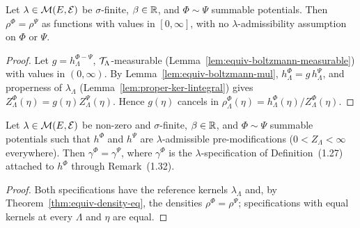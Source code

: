 \begin{theorem}
    \label{thm:equiv-density-eq}
    \leanok

    Let $\lambda \in \mathcal{M}(E, \mathcal{E})$ be $\sigma$-finite, $\beta \in \mathbb{R}$, and
    $\Phi \sim \Psi$ summable potentials. Then $\rho^\Phi = \rho^\Psi$ as functions with values
    in $[0,\infty]$, with no $\lambda$-admissibility assumption on $\Phi$ or $\Psi$.
\end{theorem}
\begin{proof}
    \leanok

    Let $g = h_\Lambda^{\Phi-\Psi}$, $\mathcal{T}_\Lambda$-measurable
    (Lemma~\ref{lem:equiv-boltzmann-measurable}) with values in $(0,\infty)$. By
    Lemma~\ref{lem:equiv-boltzmann-mul}, $h_\Lambda^\Phi = g \, h_\Lambda^\Psi$, and properness
    of $\lambda_\Lambda$ (Lemma~\ref{lem:proper-ker-lintegral}) gives $Z_\Lambda^\Phi(\eta) =
    g(\eta) Z_\Lambda^\Psi(\eta)$. Hence $g(\eta)$ cancels in $\rho_\Lambda^\Phi(\eta) =
    h_\Lambda^\Phi(\eta)/Z_\Lambda^\Phi(\eta)$.
\end{proof}

\begin{theorem}
    \label{thm:equiv-spec-eq}
    \leanok

    Let $\lambda \in \mathcal{M}(E,\mathcal{E})$ be non-zero and $\sigma$-finite, $\beta \in \mathbb{R}$, and
    $\Phi \sim \Psi$ summable potentials such that $h^\Phi$ and $h^\Psi$ are $\lambda$-admissible
    pre-modifications ($0 < Z_\Lambda < \infty$ everywhere). Then $\gamma^\Phi = \gamma^\Psi$,
    where $\gamma^\Phi$ is the $\lambda$-specification of Definition~(1.27) attached to $h^\Phi$
    through Remark~(1.32).
\end{theorem}
\begin{proof}
    \leanok

    Both specifications have the reference kernels $\lambda_\Lambda$ and, by
    Theorem~\ref{thm:equiv-density-eq}, the densities $\rho^\Phi = \rho^\Psi$; specifications
    with equal kernels at every $\Lambda$ and $\eta$ are equal.
\end{proof}

